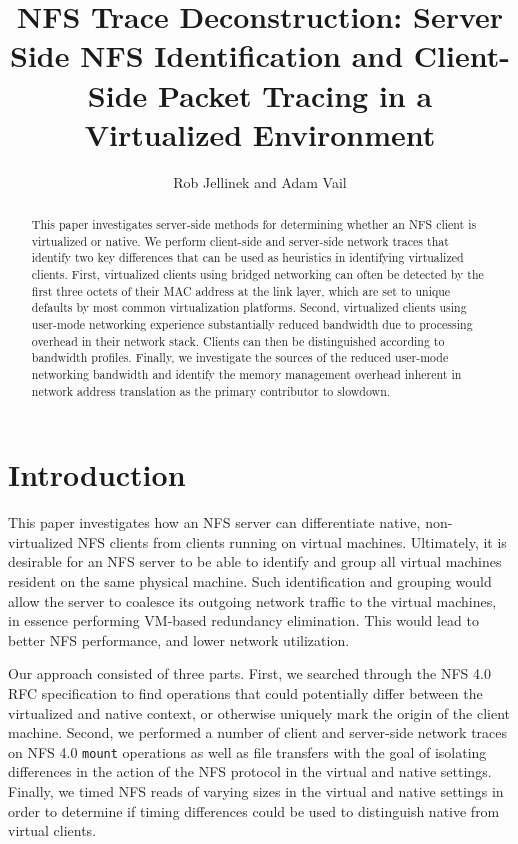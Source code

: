 \documentclass[letterpaper,twocolumn,11pt]{article}
\title{NFS Trace Deconstruction: 
Server Side NFS Identification and Client-Side Packet Tracing in a Virtualized Environment}
\author{Rob Jellinek and Adam Vail}
\begin{document}
\maketitle

\begin{abstract}
This paper investigates server-side methods for determining whether an NFS client is virtualized or native. We perform client-side and server-side network traces that identify two key differences that can be used as heuristics in identifying virtualized clients. First, virtualized clients using bridged networking can often be detected by the first three octets of their MAC address at the link layer, which are set to unique defaults by most common virtualization platforms. Second, virtualized clients using user-mode networking experience substantially reduced bandwidth due to processing overhead in their network stack. Clients can then be distinguished according to bandwidth profiles. Finally, we investigate the sources of the reduced user-mode networking bandwidth and identify the memory management overhead inherent in network address translation as the primary contributor to slowdown.
\end{abstract}

\section{Introduction}
This paper investigates how an NFS server can differentiate native, non-virtualized NFS clients from clients running on virtual machines. 
Ultimately, it is desirable for an NFS server to be able to identify and group all virtual machines resident on the same physical machine. Such identification and grouping would allow the server to coalesce its outgoing network traffic to the virtual machines, in essence performing VM-based redundancy elimination. This would lead to better NFS performance, and lower network utilization.

Our approach consisted of three parts. First, we searched through the NFS 4.0 RFC specification \cite{shepler2003network} to find operations that could potentially differ between the virtualized and native context, or otherwise uniquely mark the origin of the client machine. Second, we performed a number of client and server-side network traces on NFS 4.0 \texttt{mount} operations as well as file transfers with the goal of isolating differences in the action of the NFS protocol in the virtual and native settings. Finally, we timed NFS reads of varying sizes in the virtual and native settings in order to determine if timing differences could be used to distinguish native from virtual clients. 
\end{document}
